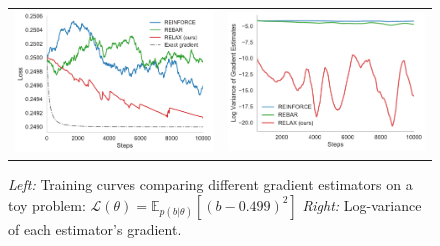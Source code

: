 \documentclass{article}
\newcommand{\E}{\mathbb{E}}
\begin{document}

\begin{figure}[h]
\hspace{-1em}
\centering
\begin{tabular}{c c}
\includegraphics[width=.48\textwidth]{figures/toy_losses_10000_0_499}
&
\includegraphics[width=.48\textwidth]{figures/variance_100_t_499}
\end{tabular}
\vspace{-1em}
\caption{
\emph{Left:} Training curves comparing different gradient estimators on a toy problem: ${\mathcal{L}(\theta) = \E_{p(b|\theta)} [ (b - 0.499)^2 ]}$
\emph{Right:} Log-variance of each estimator's gradient.
}
\label{first figure}
\end{figure}
\end{document}
